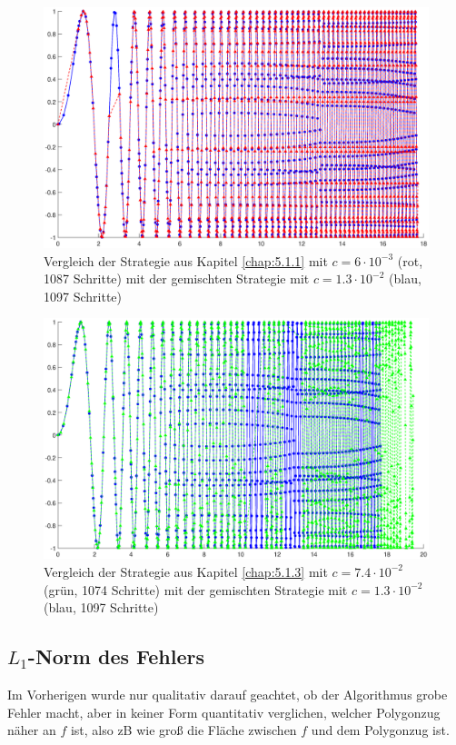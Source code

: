 \documentclass[a4paper,11pt,bibliography=totoc,listof=totoc,headinclude=true,cleardoublepage=empty,oneside]{scrartcl}
\begin{document}
\begin{figure}[ht]
	\centering
	\includegraphics[trim = 41mm 0mm 30mm 0mm, clip, width=\linewidth]{plots/adapt/br}
	\caption{Vergleich der Strategie aus Kapitel \ref{chap:5.1.1} mit $c=6 \cdot10^{-3}$ (rot, 1087 Schritte) mit der gemischten Strategie mit $c=1.3 \cdot10^{-2}$ (blau, 1097 Schritte) }
	\label{fig:br}
	
\end{figure}

\begin{figure}[ht]
	\centering
	\includegraphics[trim = 41mm 0mm 30mm 0mm, clip, width=\linewidth]{plots/adapt/bg}
	\caption{Vergleich der Strategie aus Kapitel \ref{chap:5.1.3} mit $c=7.4\cdot10^{-2}$ (grün, 1074 Schritte) mit der gemischten Strategie mit $c=1.3 \cdot10^{-2}$ (blau, 1097 Schritte) }
	\label{fig:bg}
\end{figure}

\subsection{$L_1$-Norm des Fehlers}
Im Vorherigen wurde nur qualitativ darauf geachtet, ob der Algorithmus grobe Fehler macht, aber in keiner Form quantitativ verglichen, welcher Polygonzug näher an $f$ ist, also zB wie groß die Fläche zwischen $f$ und dem Polygonzug ist.
\end{document}
